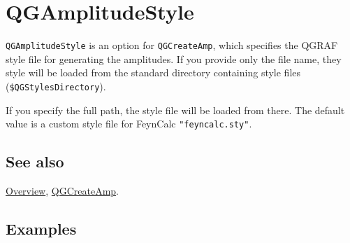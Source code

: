 \documentclass[../FeynHelpersManual.tex]{subfiles}
\begin{document}
\hypertarget{qgamplitudestyle}{
\section{QGAmplitudeStyle}\label{qgamplitudestyle}}

\texttt{QGAmplitudeStyle} is an option for \texttt{QGCreateAmp}, which
specifies the QGRAF style file for generating the amplitudes. If you
provide only the file name, they style will be loaded from the standard
directory containing style files (\texttt{\$QGStylesDirectory}).

If you specify the full path, the style file will be loaded from there.
The default value is a custom style file for FeynCalc
\texttt{"feyncalc.sty"}.

\subsection{See also}

\hyperlink{toc}{Overview}, \hyperlink{qgcreateamp}{QGCreateAmp}.

\subsection{Examples}
\end{document}
